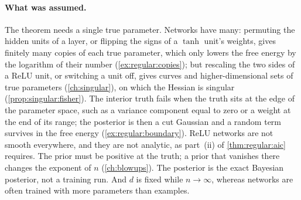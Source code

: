\begin{refsection}
\paragraph{What was assumed.} The theorem needs a single true parameter. Networks have many: permuting the hidden units of a layer, or flipping the signs of a $\tanh$ unit's weights, gives finitely many copies of each true parameter, which only lowers the free energy by the logarithm of their number (\cref{ex:regular:copies}); but rescaling the two sides of a ReLU unit, or switching a unit off, gives curves and higher-dimensional sets of true parameters (\cref{ch:singular}), on which the Hessian is singular (\cref{prop:singular:fisher}). The interior truth fails when the truth sits at the edge of the parameter space, such as a variance component equal to zero or a weight at the end of its range; the posterior is then a cut Gaussian and a random term survives in the free energy (\cref{ex:regular:boundary}). ReLU networks are not smooth everywhere, and they are not analytic, as part~(ii) of \cref{thm:regular:aic} requires. The prior must be positive at the truth; a prior that vanishes there changes the exponent of $n$ (\cref{ch:blowups}). The posterior is the exact Bayesian posterior, not a training run. And $d$ is fixed while $n\to\infty$, whereas networks are often trained with more parameters than examples.


\end{refsection}
